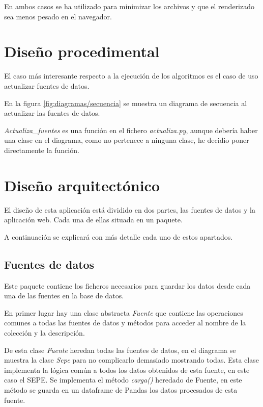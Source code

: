En ambos casos se ha utilizado  \cite{misc:mapshaper} para minimizar los archivos y que el renderizado sea menos pesado en el navegador.

\section{Diseño procedimental}

El caso más interesante respecto a la ejecución de los algoritmos es el caso de uso actualizar fuentes de datos.

En la figura \ref{fig:diagramas/secuencia} se muestra un diagrama de secuencia al actualizar las fuentes de datos.


\textit{Actualiza\_fuentes} es una función en el fichero \textit{actualiza.py}, aunque debería haber una clase en el diagrama, como no pertenece a ninguna clase, he decidio poner directamente la función.

\section{Diseño arquitectónico}

El diseño de esta aplicación está dividido en dos partes, las fuentes de datos y la aplicación web. Cada una de ellas situada en un paquete.

A continuación se explicará con más detalle cada uno de estos apartados.

\subsection{Fuentes de datos}

Este paquete contiene los ficheros necesarios para guardar los datos desde cada una de las fuentes en la base de datos.

En primer lugar hay una clase abstracta \textit{Fuente} que contiene las operaciones comunes a todas las fuentes de datos y métodos para acceder al nombre de la colección y la descripción.

De esta clase \textit{Fuente} heredan todas las fuentes de datos, en el diagrama se muestra la clase \textit{Sepe} para no complicarlo demasiado mostrando todas. Esta clase implementa la lógica común a todos los datos obtenidos de esta fuente, en este caso el SEPE. Se implementa el método \textit{carga()} heredado de Fuente, en este método se guarda en un dataframe de Pandas los datos procesados de esta fuente.

